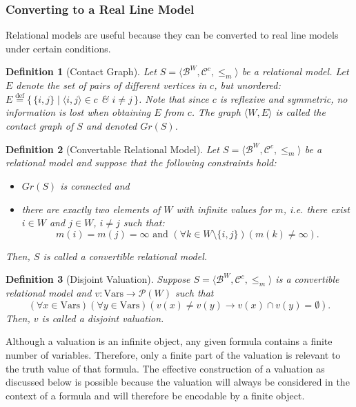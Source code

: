\documentclass{article}
\newtheorem*{definition}{Definition}
\newcommand{\pwrset}{\mathcal{P}}
\newcommand{\B}{\mathcal{B}}
\newcommand{\Vars}{\text{Vars}}
\newcommand{\eqdef}{\stackrel{\text{def}}{=}}
\begin{document}
\subsubsection{Converting to a Real Line Model}
Relational models are useful because they can be converted to real line models under certain conditions.
\begin{definition}[Contact Graph]
  Let $S = \langle \B^W, \mathcal{C}^c, \leq_m \rangle$ be a relational model. Let $E$ denote the set of pairs of different vertices in $c$, but unordered: $E \eqdef \{\, \{i, j\} \mid \langle i, j \rangle \in c$ \& $i \neq j \,\}$. Note that since $c$ is reflexive and symmetric, no information is lost when obtaining $E$ from $c$.
  The graph $\langle W, E \rangle$ is called the \emph{contact graph of $S$} and denoted $Gr(S)$.
\end{definition}
\begin{definition}[Convertable Relational Model]
Let $S = \langle \B^W, \mathcal{C}^c, \leq_m \rangle$ be a relational model and suppose that the following constraints hold:
\begin{itemize}
\item $Gr(S)$ is connected and
\item there are exactly two elements of $W$ with infinite values for $m$, i.e. there exist $i \in W$ and $j \in W$, $i \neq j$ such that:
  \begin{equation*}
    m(i) = m(j) = \infty \text{ and } (\forall k \in W \setminus \{i, j\})(m(k) \neq \infty).
  \end{equation*}
\end{itemize}
Then, $S$ is called a \emph{convertible relational model}.
\end{definition}

\begin{definition}[Disjoint Valuation]
  Suppose $S = \langle \B^W, \mathcal{C}^c, \leq_m \rangle$ is a convertible relational model and $v: \Vars \rightarrow \pwrset(W)$ such that
\begin{equation*}
(\forall x \in \Vars)(\forall y \in \Vars)(v(x) \neq v(y) \rightarrow v(x) \cap v(y) = \emptyset).
\end{equation*}
Then, $v$ is called a \emph{disjoint valuation}.
\end{definition}

Although a valuation is an infinite object, any given formula contains a finite number of variables. Therefore, only a finite part of the valuation is relevant to the truth value of that formula. The effective construction of a valuation as discussed below is possible because the valuation will always be considered in the context of a formula and will therefore be encodable by a finite object.
\end{document}

